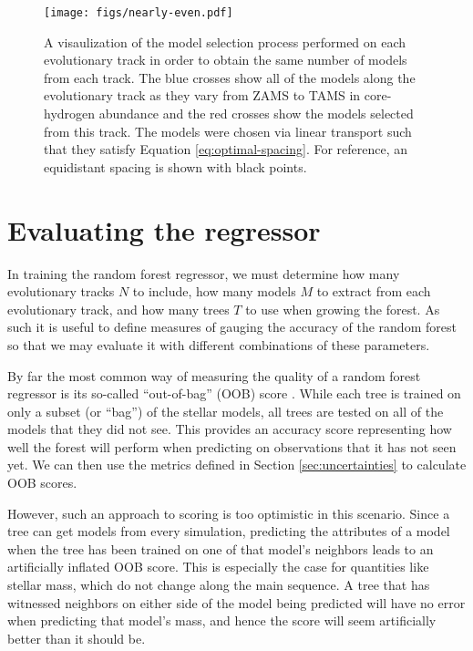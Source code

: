 \documentclass[manuscript]{aastex}
\begin{document}
\begin{figure*}
    \centering
    \texttt{[image: figs/nearly-even.pdf]}
    \caption{ A visaulization of the model selection process performed on each evolutionary track in order to obtain the same number of models from each track. The blue crosses show all of the models along the evolutionary track as they vary from ZAMS to TAMS in core-hydrogen abundance and the red crosses show the models selected from this track. The models were chosen via linear transport such that they satisfy Equation \ref{eq:optimal-spacing}. For reference, an equidistant spacing is shown with black points. }%
    \label{fig:nearly-even}
\end{figure*}


\section{Evaluating the regressor}
\label{sec:evaluation}
In training the random forest regressor, we must determine how many evolutionary tracks $N$ to include, how many models $M$ to extract from each evolutionary track, and how many trees $T$ to use when growing the forest. As such it is useful to define measures of gauging the accuracy of the random forest so that we may evaluate it with different combinations of these parameters. 

By far the most common way of measuring the quality of a random forest regressor is its so-called ``out-of-bag'' (OOB) score \citep[see e.g.~section 3.1 of][]{breiman2001random}. While each tree is trained on only a subset (or ``bag'') of the stellar models, all trees are tested on all of the models that they did not see. This provides an accuracy score representing how well the forest will perform when predicting on observations that it has not seen yet. We can then use the metrics defined in Section \ref{sec:uncertainties} to calculate OOB scores. 

However, such an approach to scoring is too optimistic in this scenario. Since a tree can get models from every simulation, predicting the attributes of a model when the tree has been trained on one of that model's neighbors leads to an artificially inflated OOB score. This is especially the case for quantities like stellar mass, which do not change along the main sequence. A tree that has witnessed neighbors on either side of the model being predicted will have no error when predicting that model's mass, and hence the score will seem artificially better than it should be. 
\end{document}
